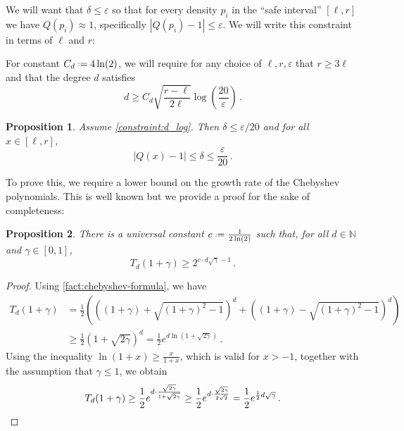 \documentclass[10pt,a4paper]{article}
\newtheorem{proposition}{Proposition}[section]
\newcommand*{\define}{\mathrel{\vcenter{\baselineskip0.5ex \lineskiplimit0pt
                      \hbox{\scriptsize.}\hbox{\scriptsize.}}}%
                      =}
\newcommand{\bN}{\ensuremath{\mathbb{N}}}
\renewcommand{\epsilon}{\varepsilon}
\begin{document}
We will want that $\delta \leq \epsilon$ so that for every density $p_i$ in the ``safe interval''
$[\ell, r]$ we have $Q(p_i) \approx 1$, specifically $|Q(p_i) - 1| \leq \epsilon$. We will write this
constraint in terms of $\ell$ and $r$:

\begin{constraint}
\label{constraint:d_log}
For constant $C_d \define 4\ln(2)$, we will require for any choice of $\ell, r, \epsilon$
that $r \ge 3\ell$ and that the degree $d$ satisfies
\[
  d \geq C_d \sqrt{\frac{r-\ell}{2\ell}} \log \left(\frac{20}{\epsilon} \right) \,.
\]
\end{constraint}

\begin{proposition}
\label{res:d_log}
Assume \cref{constraint:d_log}. Then $\delta \leq \epsilon/20$ and for all $x \in [\ell, r]$,
\[
    | Q(x) - 1 | \leq \delta \le \frac{\epsilon}{20} \,.
\]
\end{proposition}

To prove this, we require a lower bound on the growth rate of the Chebyshev polynomials. This is well
known but we provide a proof for the sake of completeness:

\begin{proposition}
\label{res:cheb-tail-lb}
There is a universal constant $c \define \frac{1}{2\ln(2)}$ such that, for all $d \in \bN$ and
$\gamma \in [0,1]$,
\[
  T_d(1 + \gamma) \geq 2^{c \cdot d \sqrt \gamma - 1} \,.
\]
\end{proposition}
\begin{proof}
    Using \cref{fact:chebyshev-formula}, we have
    \begin{align*}
        T_d(1+\gamma)
        &= \frac{1}{2} \left( \left((1+\gamma) + \sqrt{(1+\gamma)^2-1}\right)^d
            + \left((1+\gamma) - \sqrt{(1+\gamma)^2-1}\right)^d \right) \\
        &\ge \frac{1}{2} \left( 1 + \sqrt{2\gamma} \right)^d
        = \frac{1}{2} e^{d \ln(1 + \sqrt{2\gamma})} \,.
    \end{align*}
    Using the inequality $\ln(1+x) \ge \frac{x}{1+x}$, which is valid for $x > -1$, together with
    the assumption that $\gamma \le 1$, we obtain
    \[
        T_d(1+\gamma)
        \ge \frac{1}{2} e^{d \cdot \frac{\sqrt{2\gamma}}{1 + \sqrt{2\gamma}}}
        \ge \frac{1}{2} e^{d \cdot \frac{\sqrt{2\gamma}}{2\sqrt{2}}}
        = \frac{1}{2} e^{\frac{1}{2} d \sqrt{\gamma}} \,. \qedhere
    \]
\end{proof}
\end{document}
